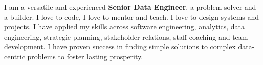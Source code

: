 
\begin{cvsummary}
  \summary
    {I am a versatile and experienced \textbf{Senior Data Engineer}, a problem solver and a builder. I love to code, I love to mentor and teach. I love to design systems and projects. I have applied my skills across software engineering, analytics, data engineering, strategic planning, stakeholder relations, staff coaching and team development. I have proven success in finding simple solutions to complex data-centric problems to foster lasting prosperity.}
\end{cvsummary}